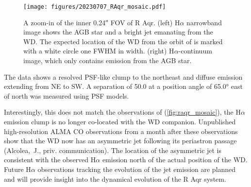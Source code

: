 \begin{figure}[h]
    \centering
    \texttt{[image: figures/20230707\_RAqr\_mosaic.pdf]}
    \caption{A zoom-in of the inner \ang{;;0.24} FOV of R Aqr. (left) H$\alpha$ narrowband image shows the AGB star and a bright jet emanating from the WD. The expected location of the WD from the orbit of \citet{alcolea_determining_2023} is marked with a white circle one FWHM in width. (right) H$\alpha$-continuum image, which only contains emission from the AGB star.\label{fig:raqr_mosaic}}
\end{figure}

The data shows a resolved PSF-like clump to the northeast and diffuse emission extending from NE to SW. A separation of \SI{50.0}{\mas} at a position angle of \ang{65.0} east of north was measured using PSF models. 

Interestingly, this does not match the observations of \citet{bujarrabal_high-resolution_2018,alcolea_determining_2023} (\autoref{fig:raqr_mosaic}), the H$\alpha$ emission clump is no longer co-located with the WD companion. Unpublished high-resolution ALMA CO observations from a month after these observations show that the WD now has an asymmetric jet following its periastron passage (Alcolea,~J., priv. communication). The location of the asymmetric jet is consistent with the observed H$\alpha$ emission north of the actual position of the WD. Future H$\alpha$ observations tracking the evolution of the jet emission are planned and will provide insight into the dynamical evolution of the R Aqr system.
